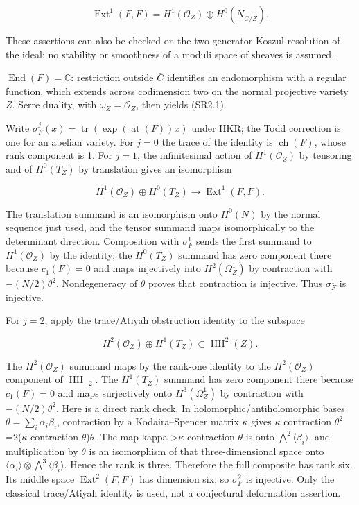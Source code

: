 \[
\operatorname{Ext}^1(F,F)=H^1(\mathcal O_Z)\oplus H^0(N_{\bar C/Z}).\tag{SR2.2}
\]

These assertions can also be checked on the two-generator Koszul resolution of the ideal; no stability or smoothness of a moduli space of sheaves is assumed.

\(\operatorname{End}(F)=\mathbb C\): restriction outside \(\bar C\) identifies an endomorphism with a regular function, which extends across codimension two on the normal projective variety \(Z\). Serre duality, with \(\omega_Z=\mathcal O_Z\), then yields (SR2.1).

Write \(\sigma_F^j(x)=\operatorname{tr}(\exp(\operatorname{at}(F))x)\) under HKR; the Todd correction is one for an abelian variety. For \(j= 0\) the trace of the identity is \(\operatorname{ch}(F)\), whose rank component is 1. For \(j= 1\), the infinitesimal action of \(H^1(\mathcal O_Z)\) by tensoring and of \(H^0(T_Z)\) by translation gives an isomorphism \cite{SR-BuchweitzFlenner2003,SR-BuchweitzFlenner2008}

\[
H^1(\mathcal O_Z)\oplus H^0(T_Z)\longrightarrow\operatorname{Ext}^1(F,F).
\]

The translation summand is an isomorphism onto \(H^0(N)\) by the normal sequence just used, and the tensor summand maps isomorphically to the determinant direction. Composition with \(\sigma_F^1\) sends the first summand to \(H^1(\mathcal O_Z)\) by the identity; the \(H^0(T_Z)\) summand has zero component there because \(c_1(F)=0\) and maps injectively into \(H^2(\Omega_Z^1)\) by contraction with \(-(N/2)\theta^2\). Nondegeneracy of \(\theta\) proves that contraction is injective. Thus \(\sigma_F^1\) is injective.

For \(j= 2\), apply the trace/Atiyah obstruction identity to the subspace

\[
H^2(\mathcal O_Z)\oplus H^1(T_Z)\subset\operatorname{HH}^2(Z).
\]

The \(H^2(\mathcal O_Z)\) summand maps by the rank-one identity to the \(H^2(\mathcal O_Z)\) component of \(\operatorname{HH}_{-2}\). The \(H^1(T_Z)\) summand has zero component there because \(c_1(F)=0\) and maps surjectively onto \(H^3(\Omega_Z^1)\) by contraction with \(-(N/2)\theta^2\). Here is a direct rank check. In holomorphic/antiholomorphic bases \(\theta=\sum_i\alpha_i\beta_i\), contraction by a Kodaira--Spencer matrix \(\kappa\) gives \(\kappa\) contraction \(\theta^2\)=2(\(\kappa\) contraction \(\theta\))\(\theta\). The map kappa-\textgreater{}\(\kappa\) contraction \(\theta\) is onto \(\bigwedge^2\langle\beta_i\rangle\), and multiplication by \(\theta\) is an isomorphism of that three-dimensional space onto \(\langle\alpha_i\rangle\otimes\bigwedge^3\langle\beta_i\rangle\). Hence the rank is three. Therefore the full composite has rank six. Its middle space \(\operatorname{Ext}^2(F,F)\) has dimension six, so \(\sigma_F^2\) is injective. Only the classical trace/Atiyah identity is used, not a conjectural deformation assertion.

